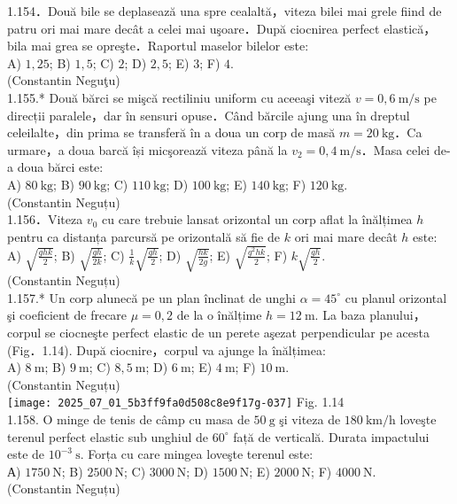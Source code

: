 1.154．Două bile se deplasează una spre cealaltă，viteza bilei mai grele fiind de patru ori mai mare decât a celei mai uşoare．După ciocnirea perfect elastică，bila mai grea se opreşte．Raportul maselor bilelor este:\\ A) $1,25$; B) $1,5$; C) $2$; D) $2,5$; E) $3$; F) $4$.\\ (Constantin Neguţu)\\

1.155.* Două bărci se mişcă rectiliniu uniform cu aceeaşi viteză $v=0,6 \mathrm{~m} / \mathrm{s}$ pe direcții paralele，dar în sensuri opuse．Când bărcile ajung una în dreptul celeilalte，din prima se transferă în a doua un corp de masă $m=20 \mathrm{~kg}$．Ca urmare，a doua barcă își micşorează viteza până la $v_{2}=0,4 \mathrm{~m} / \mathrm{s}$．Masa celei de-a doua bărci este:\\ A) $80 \mathrm{~kg}$; B) $90 \mathrm{~kg}$; C) $110 \mathrm{~kg}$; D) $100 \mathrm{~kg}$; E) $140 \mathrm{~kg}$; F) $120 \mathrm{~kg}$.\\ (Constantin Neguțu)\\

1.156．Viteza $v_{0}$ cu care trebuie lansat orizontal un corp aflat la înălțimea $h$ pentru ca distanța parcursă pe orizontală să fie de $k$ ori mai mare decât $h$ este:\\ A) $\sqrt{\frac{g h k}{2}}$; B) $\sqrt{\frac{g h}{2 k}}$; C) $\frac{1}{k} \sqrt{\frac{g h}{2}}$; D) $\sqrt{\frac{h k}{2 g}}$; E) $\sqrt{\frac{g^{2} h k}{2}}$; F) $k \sqrt{\frac{g h}{2}}$.\\ (Constantin Neguțu)\\

1.157.* Un corp alunecă pe un plan înclinat de unghi $\alpha=45^{\circ}$ cu planul orizontal şi coeficient de frecare $\mu=0,2$ de la o înălțime $h=12 \mathrm{~m}$. La baza planului，corpul se ciocneşte perfect elastic de un perete aşezat perpendicular pe acesta (Fig．1.14). După ciocnire，corpul va ajunge la înălțimea:\\ A) $8 \mathrm{~m}$; B) $9 \mathrm{~m}$; C) $8,5 \mathrm{~m}$; D) $6 \mathrm{~m}$; E) $4 \mathrm{~m}$; F) $10 \mathrm{~m}$.\\ (Constantin Neguțu)\\ \texttt{[image: 2025\_07\_01\_5b3ff9fa0d508c8e9f17g-037]} Fig. 1.14\\

1.158. O minge de tenis de câmp cu masa de $50 \mathrm{~g}$ şi viteza de $180 \mathrm{~km} / \mathrm{h}$ loveşte terenul perfect elastic sub unghiul de $60^{\circ}$ față de verticală. Durata impactului este de $10^{-3} \mathrm{~s}$. Forța cu care mingea loveşte terenul este:\\ А) $1750 \mathrm{~N}$; B) $2500 \mathrm{~N}$; C) $3000 \mathrm{~N}$; D) $1500 \mathrm{~N}$; E) $2000 \mathrm{~N}$; F) $4000 \mathrm{~N}$.\\ (Constantin Neguțu)\\

